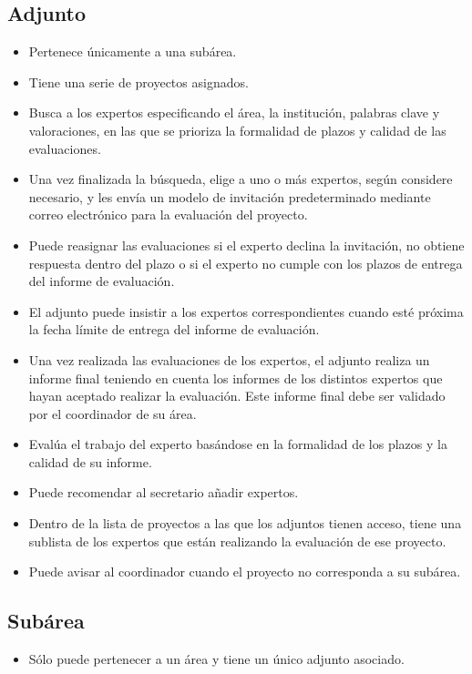 \documentclass[11pt,a4paper,spanish,twoside]{book}
\begin{document}
\subsection{Adjunto}
\begin{itemize}
\item Pertenece únicamente a una subárea.
\item Tiene una serie de proyectos asignados.
\item Busca a los expertos especificando el área, la institución, palabras
  clave y valoraciones, en las que se prioriza la formalidad de plazos y
  calidad de las evaluaciones. 
\item Una vez finalizada la búsqueda, elige a uno o más expertos, según
  considere necesario, y les envía un modelo de invitación predeterminado
  mediante correo electrónico para la evaluación del proyecto.  
\item Puede reasignar las evaluaciones si el experto declina la invitación,
  no obtiene respuesta dentro del plazo o si el experto no cumple con los
  plazos de entrega del informe de evaluación.
\item El adjunto puede insistir a los expertos correspondientes cuando esté
  próxima la fecha límite de entrega del informe de evaluación.
\item Una vez realizada las evaluaciones de los expertos, el adjunto
  realiza un informe final teniendo en cuenta los informes de los distintos
  expertos que hayan aceptado realizar la evaluación. Este informe final
  debe ser validado por el coordinador de su área. 
\item Evalúa el trabajo del experto basándose en la formalidad de los plazos
  y la calidad de su informe. 
\item Puede recomendar al secretario añadir expertos.
\item Dentro de la lista de proyectos a las que los adjuntos tienen acceso,
  tiene una sublista de los expertos que están realizando la evaluación de
  ese proyecto.  
\item Puede avisar al coordinador cuando el proyecto no corresponda a su
  subárea. 
\end{itemize}

\subsection{Subárea}
\begin{itemize}
\item Sólo puede pertenecer a un área y tiene un único adjunto asociado.
\end{itemize}
\end{document}
